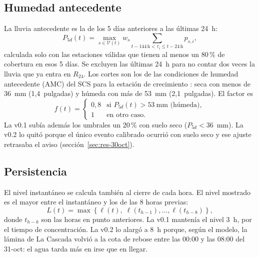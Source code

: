 \documentclass{sosg-informe}
\begin{document}
\subsection{Humedad antecedente}
La lluvia antecedente es la de los 5 días anteriores a las últimas 24~h:
\begin{equation}\label{eq:p5d}
  P_{5d}(t) = \max_{s \in \mathcal{V}(t)} w_s \sum_{t - 144\,\text{h} < \tau_i \leq t - 24\,\text{h}} p_{s,i},
\end{equation}
calculada solo con las estaciones válidas que tienen al menos un 80\,\% de cobertura en esos 5 días. Se excluyen las últimas 24~h para no contar dos veces la lluvia que ya entra en $R_{24}$. Los cortes son los de las condiciones de humedad antecedente (AMC) del SCS para la estación de crecimiento \citep{scs1972,mishra2003}: seca con menos de 36~mm (1,4~pulgadas) y húmeda con más de 53~mm (2,1~pulgadas). El factor es
\begin{equation}\label{eq:factor}
  f(t) = \begin{cases} 0{,}8 & \text{si } P_{5d}(t) > 53~\text{mm (húmeda)},\\ 1 & \text{en otro caso.}\end{cases}
\end{equation}
La v0.1 subía además los umbrales un 20\,\% con suelo seco ($P_{5d} < 36$~mm). La v0.2 lo quitó porque el único evento calibrado ocurrió con suelo seco y ese ajuste retrasaba el aviso (sección~\ref{sec:res-30oct}).

\subsection{Persistencia}
El nivel instantáneo se calcula también al cierre de cada hora. El nivel mostrado es el mayor entre el instantáneo y los de las 8 horas previas:
\begin{equation}\label{eq:pers}
  L(t) = \max\left\{\ell(t),\; \ell(t_{h-1}), \ldots, \ell(t_{h-8})\right\},
\end{equation}
donde $t_{h-k}$ son las horas en punto anteriores. La v0.1 mantenía el nivel 3~h, por el tiempo de concentración. La v0.2 lo alargó a 8~h porque, según el modelo, la lámina de La Cascada volvió a la cota de rebose entre las 00:00 y las 08:00 del 31-oct: el agua tarda más en irse que en llegar.
\end{document}
